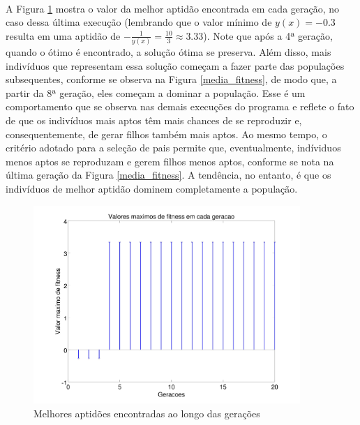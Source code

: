 \documentclass{report}
\begin{document}
	\paragraph{} A Figura \ref{melhores_fitness} mostra o valor da melhor aptidão encontrada em cada geração, no caso dessa última execução (lembrando que o valor mínimo de $y(x) = -0.3$ resulta em uma aptidão de $-\frac{1}{y(x)} = \frac{10}{3} \approx 3.33$). Note que após a 4ª geração, quando o ótimo é encontrado, a solução ótima se preserva. Além disso, mais indivíduos que representam essa solução começam a fazer parte das populações subsequentes, conforme se observa na Figura \ref{media_fitness}, de modo que, a partir da 8ª geração, eles começam a dominar a população. Esse é um comportamento que se observa nas demais execuções do programa e reflete o fato de que os indivíduos mais aptos têm mais chances de se reproduzir e, consequentemente, de gerar filhos também mais aptos. Ao mesmo tempo, o critério adotado para a seleção de pais permite que, eventualmente, indíviduos menos aptos se reproduzam e gerem filhos menos aptos, conforme se nota na última geração da Figura \ref{media_fitness}. A tendência, no entanto, é que os indivíduos de melhor aptidão dominem completamente a população. 
	
	\begin{figure}[H]
		\includegraphics[width=0.9\textwidth]{Q01_melhores_fitness.jpg}
		\caption{Melhores aptidões encontradas ao longo das gerações}
		\label{melhores_fitness}
	\end{figure}
	
\end{document}
